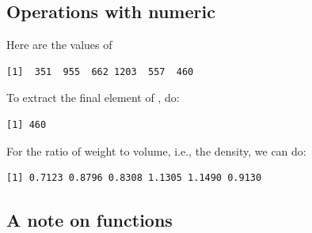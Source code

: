 \subsection*{Operations with numeric }
Here are the values of 
\begin{knitrout}
\color{fgcolor}\begin{kframe}
\begin{alltt}
\end{alltt}
\begin{verbatim}
[1]  351  955  662 1203  557  460
\end{verbatim}
\end{kframe}
\end{knitrout}

To extract the final element of , do:
\begin{knitrout}
\color{fgcolor}\begin{kframe}
\begin{alltt}
\hlstd{volume[}\hlstd{]}
\end{alltt}
\begin{verbatim}
[1] 460
\end{verbatim}
\end{kframe}
\end{knitrout}
For the ratio of weight to volume, i.e., the density, we can do:
\begin{knitrout}
\color{fgcolor}\begin{kframe}
\begin{alltt}
\hlopt{/}
\end{alltt}
\begin{verbatim}
[1] 0.7123 0.8796 0.8308 1.1305 1.1490 0.9130
\end{verbatim}
\end{kframe}
\end{knitrout}

\subsection*{A note on functions}

